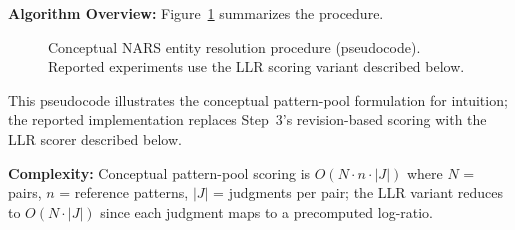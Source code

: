 \documentclass{article}
\begin{document}
\textbf{Algorithm Overview:} Figure~\ref{fig:algo} summarizes the procedure.

\begin{figure}[H]
  \centering
  \caption{Conceptual NARS entity resolution procedure (pseudocode). Reported experiments use the LLR scoring variant described below.}
  \label{fig:algo}
\end{figure}

This pseudocode illustrates the conceptual pattern-pool formulation for intuition; the reported implementation replaces Step~3's revision-based scoring with the LLR scorer described below.

\textbf{Complexity:} Conceptual pattern-pool scoring is $O(N \cdot n \cdot |J|)$ where $N$ = pairs, $n$ = reference patterns, $|J|$ = judgments per pair; the LLR variant reduces to $O(N \cdot |J|)$ since each judgment maps to a precomputed log-ratio.
\end{document}
